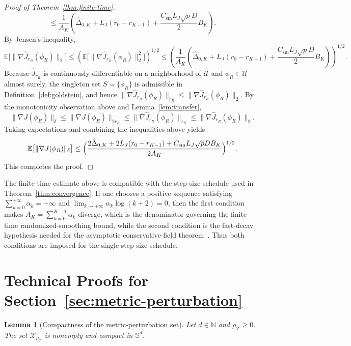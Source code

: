 \documentclass[11pt, letterpaper, oneside, reqno]{amsart}
\newtheorem{lemma}{Lemma}
\begin{document}
\begin{proof}[Proof of Theorem~\ref{thm:finite-time}]
\[\le \frac{1}{A_K}\left(\hat\Delta_{0,K}+L_J(r_0-r_{K-1})+\frac{C_{\mathrm{sm}}L_J\sqrt p D}{2} B_K\right).
\]
By Jensen's inequality,
\[
\mathbb E\big[\|\nabla \hat J_{r_R}(\phi_R)\|_2\big]
\le \left(\mathbb E\big[\|\nabla \hat J_{r_R}(\phi_R)\|_2^2\big]\right)^{1/2}
\le \left(\frac{1}{A_K}\left(\hat\Delta_{0,K}+L_J(r_0-r_{K-1})+\frac{C_{\mathrm{sm}}L_J\sqrt p D}{2} B_K\right)\right)^{1/2}.
\]
Because $\hat J_{r_R}$ is continuously differentiable on a neighborhood of $\mathcal U$ and $\phi_R\in\mathcal U$ almost surely, the singleton set $S=\{\phi_R\}$ is admissible in Definition~\ref{def:goldstein}, and hence
$\|\nabla \hat J_{r_R}(\phi_R)\|_{r_R}\le \|\nabla \hat J_{r_R}(\phi_R)\|_2$.
By the monotonicity observation above and Lemma~\ref{lem:transfer},
\[
\|\nabla J(\phi_R)\|_{\delta}
\le \|\nabla J(\phi_R)\|_{2r_R}
\le \|\nabla \hat J_{r_R}(\phi_R)\|_{r_R}
\le \|\nabla \hat J_{r_R}(\phi_R)\|_2.
\]
Taking expectations and combining the inequalities above yields
\[
\mathbb{E}\bigl[\|\nabla J(\phi_R)\|_{\delta}\bigr]
\leq \Bigl(\frac{2\hat\Delta_{0,K} + 2L_J(r_0-r_{K-1}) + C_{\mathrm{sm}}L_J\sqrt p D B_K}{2A_K}\Bigr)^{1/2}.
\]
This completes the proof.
\end{proof}

The finite-time estimate above is compatible with the step-size schedule used in Theorem~\ref{thm:convergence}. If one chooses a positive sequence satisfying
$\sum_{k=0}^{+\infty}\alpha_k=+\infty$
and
$\lim_{k\to+\infty}\alpha_k\log(k+2)=0$,
then the first condition makes $A_K=\sum_{k=0}^{K-1}\alpha_k$ diverge, which is the denominator governing the finite-time randomized-smoothing bound, while the second condition is the fast-decay hypothesis needed for the asymptotic conservative-field theorem~\cite[Theorem~9]{ref:bolte2021conservative}. Thus both conditions are imposed for the single step-size schedule.


\section{Technical Proofs for Section~\ref{sec:metric-perturbation}}\label{ec:proofs-metric-perturbation}
\begin{lemma}[Compactness of the metric-perturbation set]
\label{lem:burg-compact}
Let $d \in \mathbb N$ and $\rho_{\mathcal T} \ge 0$. The set $\mathcal X_{\rho_{\mathcal T}}$ is nonempty and compact in $\mathbb S^d$.
\end{lemma}
\end{document}
